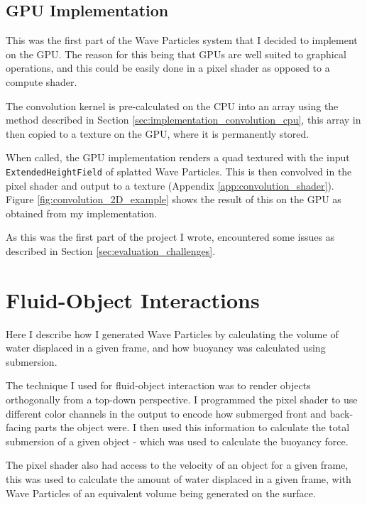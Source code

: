 \documentclass[12pt,a4paper,twoside]{report}
\begin{document}
\subsection{GPU Implementation}
\label{sec:implementation_convolution_gpu}

This was the first part of the Wave Particles system that I decided to
implement on the GPU. The reason for this being that GPUs are well suited to
graphical operations, and this could be easily done in a pixel shader as
opposed to a compute shader.

The convolution kernel is pre-calculated on the CPU into an array using the
method described in Section \ref{sec:implementation_convolution_cpu}, this
array in then copied to a texture on the GPU, where it is permanently stored.

When called, the GPU implementation renders a quad textured with the input
\texttt{ExtendedHeightField} of splatted Wave Particles. This is then convolved
in the pixel shader and output to a texture (Appendix
\ref{app:convolution_shader}). Figure \ref{fig:convolution_2D_example} shows
the result of this on the GPU as obtained from my implementation.

As this was the first part of the project I wrote, encountered some issues
as described in Section \ref{sec:evaluation_challenges}.

\section{Fluid-Object Interactions}

Here I describe how I generated Wave Particles by calculating the
volume of water displaced in a given frame, and how buoyancy was calculated
using submersion. 

The technique I used for fluid-object interaction was to render objects
orthogonally from a top-down perspective. I programmed the pixel shader to use
different color channels in the output to encode how submerged front and
back-facing parts the object were. I then used this information to calculate
the total submersion of a given object - which was used to calculate the
buoyancy force.


The pixel shader also had access to the velocity of an object for a given frame,
this was used to calculate the amount of water displaced in a given frame, with
Wave Particles of an equivalent volume being generated on the surface.
\end{document}
